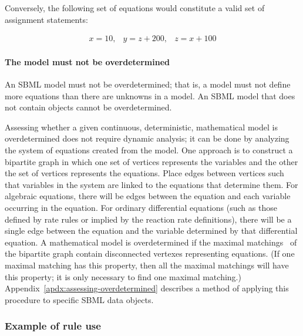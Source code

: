 Conversely, the following set of equations would constitute a
valid set of assignment statements:
\begin{linenomath}
\begin{equation*}
  \begin{array}{lll}
    x = 10, & y = z + 200, & z = x + 100
  \end{array}
\end{equation*}
\end{linenomath}


\paragraph{The model must not be overdetermined}

An SBML model must not be overdetermined; that is, a model must
not define more equations than there are unknowns in a model.  An
SBML model that does not contain \AlgebraicRule objects cannot
be overdetermined.

Assessing whether a given continuous, deterministic, mathematical
model is overdetermined does not require dynamic analysis; it can
be done by analyzing the system of equations created from the
model.  One approach is to construct a bipartite graph in which
one set of vertices represents the variables and the other the set
of vertices represents the equations.  Place edges between
vertices such that variables in the system are linked to the
equations that determine them.  For algebraic equations, there
will be edges between the equation and each variable occurring in
the equation.  For ordinary differential equations (such as those
defined by rate rules or implied by the reaction rate
definitions), there will be a single edge between the equation and
the variable determined by that differential equation.  A
mathematical model is overdetermined if the maximal
matchings~\citep{chartrand_1977} of the bipartite graph contain
disconnected vertexes representing equations.  (If one maximal
matching has this property, then all the maximal matchings will
have this property; \ie it is only necessary to find one maximal
matching.)  Appendix~\ref{apdx:assessing-overdetermined} describes
a method of applying this procedure to specific SBML data objects.


\subsubsection{Example of rule use}
\label{sec:eg-rule-use}

